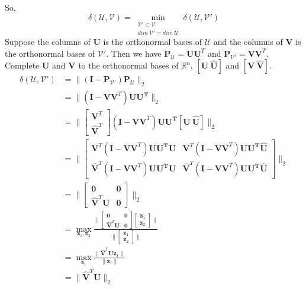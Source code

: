 \documentclass[22pt]{article}
\begin{document}
		 So,\begin{equation}
		 	\delta(\mathcal{U,V}) = \min_{\substack{\mathcal{V'}\subset \mathcal{V}\\ dim\ \mathcal{V'} = dim\ \mathcal{U}}} \delta(\mathcal{U,V'}) 
		 \end{equation}
		 Suppose the columns of $\mathbf{U}$ is the orthonormal bases of $\mathcal{U}$ and the columns of $\mathbf{V}$ is the orthonormal bases of $\mathcal{V'}$. Then we have $\mathbf{P}_\mathcal{U}= \mathbf{UU}^T$ and $\mathbf{P}_\mathcal{V'} =\mathbf{VV}^T$. Complete $\mathbf{U}$ and $\mathbf{V}$ to the orthonormal bases of $\mathbb{R}^n$, $[\mathbf{U\ \hat{U}}]$ and $[\mathbf{V\ \hat{V}}]$.
		 \begin{align}
		 	\delta(\mathcal{U,V'}) & = \|(\mathbf{I}-\mathbf{P}_\mathcal{V'})\mathbf{P}_\mathcal{U}\|_2\\
		 	& = \|(\mathbf{I-VV}^T)\mathbf{UU^T}\|_2\\
		 	& = \|\left[\begin{array}{c} \mathbf{V}^T \\ \mathbf{\hat{V}}^T \end{array}\right](\mathbf{I-VV}^T)\mathbf{UU^T}[\mathbf{U} \ \hat{\mathbf{U}}]\|_2\\
		 	& = \| \left[\begin{array}{cc} \mathbf{V}^T(\mathbf{I-VV}^T)\mathbf{UU^T}\mathbf{U} & \mathbf{V}^T(\mathbf{I-VV}^T)\mathbf{UU^T}\mathbf{\hat{U}} \\\mathbf{\hat{V}}^T(\mathbf{I-VV}^T)\mathbf{UU^T}\mathbf{U} & \mathbf{\hat{V}}^T(\mathbf{I-VV}^T)\mathbf{UU^T}\mathbf{\hat{U}} \end{array}\right]\|_2\\
		 	& = \|\left[\begin{array}{cc} \mathbf{0} & \mathbf{0} \\ \mathbf{\hat{V}}^T\mathbf{U} & \mathbf{0} \end{array}\right] \|_2\\
		 	& = \max_{\mathbf{z}_1,\mathbf{z}_2}\frac{\|\left[\begin{array}{cc} \mathbf{0} & \mathbf{0} \\ \mathbf{\hat{V}}^T\mathbf{U} & \mathbf{0} \end{array}\right]\left[\begin{array}{c} \mathbf{z}_1 \\ \mathbf{z}_2 \end{array}\right] \|}{\|\left[\begin{array}{c} \mathbf{z}_1 \\ \mathbf{z}_2 \end{array}\right] \|}\\
		 	& = \max_{\mathbf{z}_1} \frac{\|\mathbf{\hat{V}}^T\mathbf{Uz}_1\|}{\|\mathbf{z}_1\|}\\
		 	& = \|\mathbf{\hat{V}}^T\mathbf{U}\|_2
		 \end{align}
\end{document}
